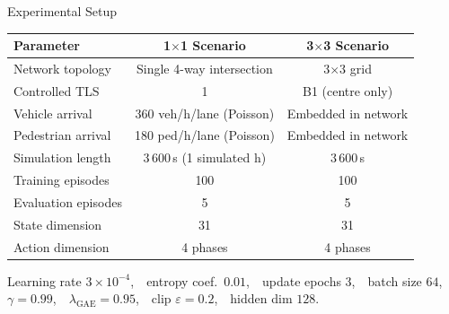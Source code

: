\documentclass[final,20pt]{beamer}
\newlength{\colwidth}
\begin{document}
\begin{frame}[t]
\begin{columns}[t]
\begin{column}{\colwidth}
\begin{block}{Experimental Setup}
    \begin{center}
    \begin{tabular}{lcc}
      \toprule
      \textbf{Parameter} & \textbf{1$\times$1 Scenario} & \textbf{3$\times$3 Scenario} \\
      \midrule
      Network topology      & Single 4-way intersection & 3$\times$3 grid \\
      Controlled TLS        & 1                         & B1 (centre only) \\
      Vehicle arrival       & 360 veh/h/lane (Poisson)  & Embedded in network \\
      Pedestrian arrival    & 180 ped/h/lane (Poisson)  & Embedded in network \\
      Simulation length     & 3\,600\,s (1 simulated h) & 3\,600\,s \\
      Training episodes     & 100                       & 100 \\
      Evaluation episodes   & 5                         & 5 \\
      State dimension       & 31                        & 31 \\
      Action dimension      & 4 phases                  & 4 phases \\
      \bottomrule
    \end{tabular}
    \end{center}

    \vspace{0.5cm}

    Learning rate $3\!\times\!10^{-4}$,\ \ entropy coef.\ $0.01$,\ \
    update epochs $3$,\ \ batch size $64$,\ \ $\gamma\!=\!0.99$,\ \
    $\lambda_\text{GAE}\!=\!0.95$,\ \ clip $\varepsilon\!=\!0.2$,\ \
    hidden dim $128$.

  \end{block}


\end{column}
\end{columns}
\end{frame}
\end{document}
